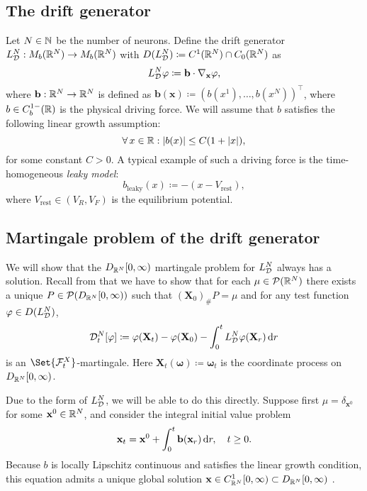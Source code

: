 \subsection{The drift generator}

Let $N \in \mathbb{N}$ be the number of neurons.
Define the drift generator $L_{\mathcal{D}}^{N} : M_b(\mathbb{R}^N) \to M_b(\mathbb{R}^N)$ with $D(L_{\mathcal{D}}^N) \coloneqq C^1(\mathbb{R}^N) \cap C_0(\mathbb{R}^N)$ as
\begin{equation}
    L_{\mathcal{D}}^{N}\varphi \coloneqq \mathbf{b} \cdot \nabla_{\mathbf{x}} \varphi,
\end{equation}
where $\mathbf{b} : \mathbb{R}^N \to \mathbb{R}^N$ is defined as $\bm{b}(\bm{x}) \coloneqq (b(x^1), \dots, b(x^N))^\top$, where $b \in C_b^{1-}(\mathbb{R})$ is the physical driving force.
We will assume that $b$ satisfies the following linear growth assumption:
\begin{equation}
    \forall x \in \potspace : \abs{b(x)} \leq C (1 + \abs{x}),
\end{equation}
for some constant $C > 0$.
\newline
A typical example of such a driving force is the time-homogeneous \textit{leaky model}:
\begin{equation}
    b_{\mathrm{leaky}}(x) \coloneqq -(x - V_\mathrm{rest}),
\end{equation}
where $V_\mathrm{rest} \in (V_R, V_F)$ is the equilibrium potential.


\subsection{Martingale problem of the drift generator}

We will show that the $D_{\mathbb{R}^N}[0,\infty)$ martingale problem for $L_{\mathcal{D}}^N$ always has a solution.
Recall from  that we have to show that for each $\mu \in \mathcal{P}(\mathbb{R}^N)$ there exists a unique $P \in \mathcal{P}(D_{\mathbb{R}^N}[0,\infty))$ such that $(\bm{X}_0)_\# P = \mu$ and for any test function $\varphi \in D(L_{\mathcal{D}}^N)$,
\begin{equation}
    \cD_t^{N}[\varphi]
    \coloneqq \varphi(\bm{X}_t) - \varphi(\bm{X}_0) - \int_0^t L_{\cD}^{N} \varphi(\bm{X}_r) \odif{r}
\end{equation}
is an $\Set{\cF_t^X}$-martingale.
Here $\bm{X}_t(\bm{\omega}) \coloneqq \bm{\omega}_t$ is the coordinate process on $D_{\mathbb{R}^N}[0,\infty)$.

Due to the form of $L_{\mathcal{D}}^N$, we will be able to do this directly.
Suppose first $\mu = \delta_{\bm{x}^0}$ for some $\mathbf{x}^0 \in \mathbb{R}^N$, and consider the integral initial value problem
\begin{equation}
    \bm{x}_t = \bm{x}^0 + \int_0^t \bm{b}(\bm{x}_r) \odif{r}, \quad t \geq 0.
\end{equation}
Because $b$ is locally Lipschitz continuous and satisfies the linear growth condition, this equation admits a unique global solution $\mathbf{x} \in C^1_{\mathbb{R}^N}[0,\infty) \subset D_{\mathbb{R}^N}[0,\infty)$ \cite{ode_result}.

